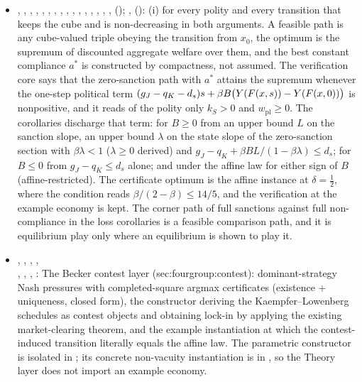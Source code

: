 \begin{itemize}[leftmargin=1.4em,itemsep=1pt]
\item {}, , , , , , , , , , , , , , , ,  (); ,  (): (i) for every polity and every transition that keeps the cube and is non-decreasing in both arguments. A feasible path is any cube-valued triple obeying the transition from $x_0$, the optimum is the supremum of discounted aggregate welfare over them, and the best constant compliance $a^\ast$ is constructed by compactness, not assumed. The verification core says that the zero-sanction path with $a^\ast$ attains the supremum whenever the one-step political term $(g_J-q_K-d_s)s+\beta B\bigl(Y(F(x,s))-Y(F(x,0))\bigr)$ is nonpositive, and it reads of the polity only $k_S>0$ and $w_{\mathrm{pl}}\ge0$. The corollaries discharge that term: for $B\ge0$ from an upper bound $L$ on the sanction slope, an upper bound $\lambda$ on the state slope of the zero-sanction section with $\beta\lambda<1$ ($\lambda\ge0$ derived) and $g_J-q_K+\beta BL/(1-\beta\lambda)\le d_s$; for $B\le0$ from $g_J-q_K\le d_s$ alone; and under the affine law for either sign of $B$ (affine-restricted). The certificate optimum  is the affine instance at $\delta=\tfrac12$, where the condition reads $\beta/(2-\beta)\le14/5$, and the verification at the example economy is kept. The corner path of full sanctions against full non-compliance in the loss corollaries is a feasible comparison path, and it is equilibrium play only where an equilibrium is shown to play it.
\item {}, ,
, ,\\
, ,
, :
The Becker contest layer (sec:fourgroup:contest): dominant-strategy Nash
pressures with completed-square argmax certificates (existence + uniqueness,
closed form), the constructor deriving the Kaempfer--Lowenberg schedules as
contest objects and obtaining lock-in by applying the existing market-clearing
theorem, and the example instantiation at which the contest-induced transition
literally equals the affine law.  The parametric constructor is isolated in
; its concrete
non-vacuity instantiation is in
, so the Theory layer does not
import an example economy.
\end{itemize}

